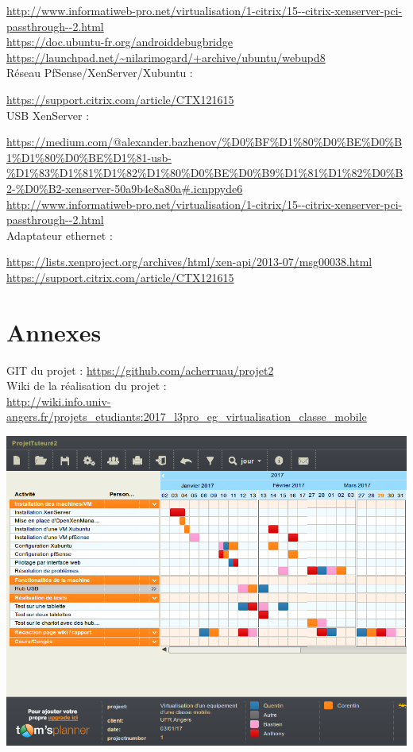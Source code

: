 \documentclass[a4paper,12pt]{extarticle}
\begin{document}
\url{http://www.informatiweb-pro.net/virtualisation/1-citrix/15--citrix-xenserver-pci-passthrough--2.html}\\
\url{https://doc.ubuntu-fr.org/androiddebugbridge}\\
\url{https://launchpad.net/~nilarimogard/+archive/ubuntu/webupd8}\\

Réseau PfSense/XenServer/Xubuntu :

\url{https://support.citrix.com/article/CTX121615}\\

USB XenServer :

\url{https://medium.com/@alexander.bazhenov/\%D0\%BF\%D1\%80\%D0\%BE\%D0\%B1\%D1\%80\%D0\%BE\%D1\%81-usb-\%D1\%83\%D1\%81\%D1\%82\%D1\%80\%D0\%BE\%D0\%B9\%D1\%81\%D1\%82\%D0\%B2-\%D0\%B2-xenserver-50a9b4e8a80a#.icnppyde6}\\
\url{http://www.informatiweb-pro.net/virtualisation/1-citrix/15--citrix-xenserver-pci-passthrough--2.html}\\

Adaptateur ethernet :

\url{https://lists.xenproject.org/archives/html/xen-api/2013-07/msg00038.html}\\
\url{https://support.citrix.com/article/CTX121615}\\

\clearpage

\section{Annexes}

GIT du projet :
\url{https://github.com/acherruau/projet2}\\

Wiki de la réalisation du projet :\\ 
\url{http://wiki.info.univ-angers.fr/projets_etudiants:2017_l3pro_eg_virtualisation_classe_mobile}\\

\begin{center}
\includegraphics[scale=1, angle=270]{Gantt4}
\end{center}
\end{document}
